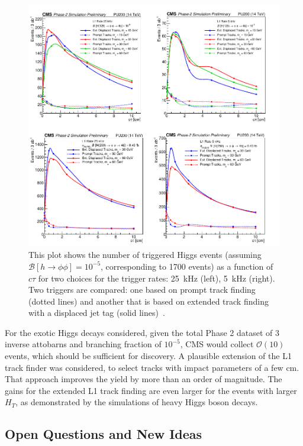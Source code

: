 \begin{figure}[hbtp]
  \centering
    \includegraphics{tex/figures/CMS-PAS-FTR-18-018_Figure_009.pdf}
    \caption{This plot shows the number of triggered Higgs events (assuming ${\mathcal{B}[\ensuremath{h \to \phi\phi}\xspace] = 10^{-5}}$, corresponding to 1700 events) as a function of $c\tau$ for two choices for the trigger rates: 25~kHz (left), 5~kHz (right). Two triggers are compared: one based on prompt track finding (dotted lines) and another that is based on extended track finding with a displaced jet tag (solid lines)~\cite{CMS:2018qgk}.}
    \label{fig:money}
\end{figure}

For the exotic Higgs decays considered, given the total Phase 2 dataset of 3 inverse attobarns and branching fraction of $10^{-5}$,
CMS would collect $\mathcal{O}(10)$ events, which should be sufficient for discovery.
A plausible extension of the L1 track finder was considered, to select tracks with impact parameters of a few cm.
That approach improves the yield by more than an order of magnitude. The gains for the extended L1 track finding
are even larger for the events with larger $H_T$, as demonstrated by the simulations of heavy Higgs boson decays.

\subsection{Open Questions and New Ideas}\label{sec:upgradeideas}


